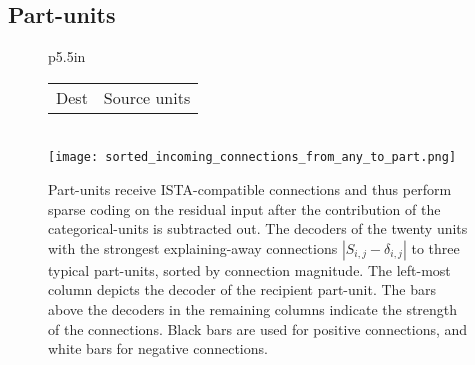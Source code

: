 \documentclass{article} %
\begin{document}
\begin{comment}
\begin{itemize}
\item Histogram of angle between encoder and decoder, with separate overlaid histograms for part units and classification units defined by classification matrix column norm
\item Overlaid trajectories of units in response to a single input, with lines colored by classification dictionary column norm; show that part units turn on first and plateau, while classification units turn on later and grow without bound.  Since the part-units that are most diagnostic of a categorical unit will likely be turned off as the categorical unit increases its activation and subtracts out those features from the input, it makes sense to integrate part-unit excitations to categorical-units over time.
\item Scatterplot of angle between decoder and encoder / probability of activating on the second iteration versus classification dictionary column norm
\item Scatterplot of weighted average categoricalness of recurrent connections versus categoricalness
\end{itemize}
\end{comment}


\subsection{Part-units}

\begin{figure}[tb] %
  \begin{center}
    \begin{tabular}{p{5.5in}}
      \hspace{-0.1in} \begin{tabular}{p{0.175in}p{4in}} Dest & Source units \end{tabular} \\
      \texttt{[image: sorted\_incoming\_connections\_from\_any\_to\_part.png]} 
    \end{tabular}
  \end{center}
  \caption{Part-units receive ISTA-compatible connections and thus perform sparse coding on the residual input after the contribution of the categorical-units is subtracted out.  The decoders of the twenty units with the strongest explaining-away connections $\left|S_{i,j} - \delta_{i,j}\right|$ to three typical part-units, sorted by connection magnitude.  The left-most column depicts the decoder of the recipient part-unit.  The bars above the decoders in the remaining columns indicate the strength of the connections.  Black bars are used for positive connections, and white bars for negative connections.  \label{incoming_part_figure}}
\end{figure}
\end{document}
